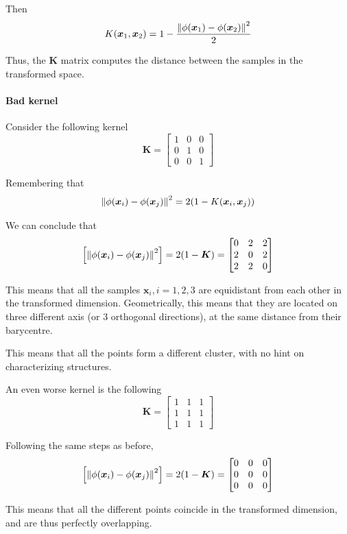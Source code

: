 \documentclass[oneside,onecolumn]{report}
\begin{document}
Then
$$ K(\bm x_1, \bm x_2) = 1 - \frac{\norm{\phi(\bm x_1) - \phi(\bm x_2)}^2}{2} $$

Thus, the $\bm K$ matrix computes the distance between the samples in the transformed space.

\paragraph{Bad kernel}
Consider the following kernel
$$ \bm K = \begin{bmatrix}
    1 & 0 & 0 \\
    0 & 1 & 0 \\
    0 & 0 & 1
\end{bmatrix} $$

Remembering that
$$ \norm{\phi(\bm x_i) - \phi(\bm x_j)}^2 = 2 (1 - K(\bm x_i, \bm x_j)) $$

We can conclude that
$$ \left[ \norm{\phi(\bm x_i) - \phi(\bm x_j)}^2 \right] = 2 (1 - \bm K) = \begin{bmatrix}
    0 & 2 & 2 \\
    2 & 0 & 2 \\
    2 & 2 & 0
\end{bmatrix} $$

This means that all the samples $\bm x_i, i = 1, 2, 3$ are equidistant from each other in the transformed dimension.
Geometrically, this means that they are located on three different axis (or 3 orthogonal directions), at the same distance from their barycentre.

This means that all the points form a different cluster, with no hint on characterizing structures.

An even worse kernel is the following
$$ \bm K = \begin{bmatrix}
    1 & 1 & 1 \\
    1 & 1 & 1 \\
    1 & 1 & 1
\end{bmatrix} $$

Following the same steps as before,
$$ \left[ \norm{\phi(\bm x_i) - \phi(\bm x_j)}^2 \right] = 2 (1 - \bm K) = \begin{bmatrix}
    0 & 0 & 0 \\
    0 & 0 & 0 \\
    0 & 0 & 0
\end{bmatrix} $$

This means that all the different points coincide in the transformed dimension, and are thus perfectly overlapping.
\end{document}
